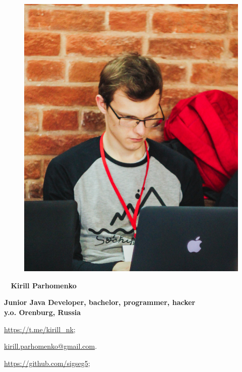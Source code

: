 \begin{figure}
	\hfill
	\includegraphics[width=0.6\columnwidth]{photo}
	\vspace{-7cm}
\end{figure}

\begin{flushright}\small

\end{flushright}\normalsize
\framebreak



\Huge\bfseries\ {{\color{Cyan} Kirill} {\color{Black} Parhomenko}} \\
\NegativeSmallSep

\normalsize\bfseries Junior Java Developer, bachelor, programmer, hacker \\
\small { y.o. Orenburg, Russia}

\normalsize\normalfont
\SmallSep


\begin{multicols}{2}
	\begin{compactitem}[\color{Cyan}$\circ$]
		\item\small \url{https://t.me/kirill_nk};
		\item\small \href{mailto:kirill.parhomenko@gmail.com}{kirill.parhomenko@gmail.com}.
		\item\small \url{https://github.com/sigseg5};
	\end{compactitem}
\end{multicols}

\SmallSep



